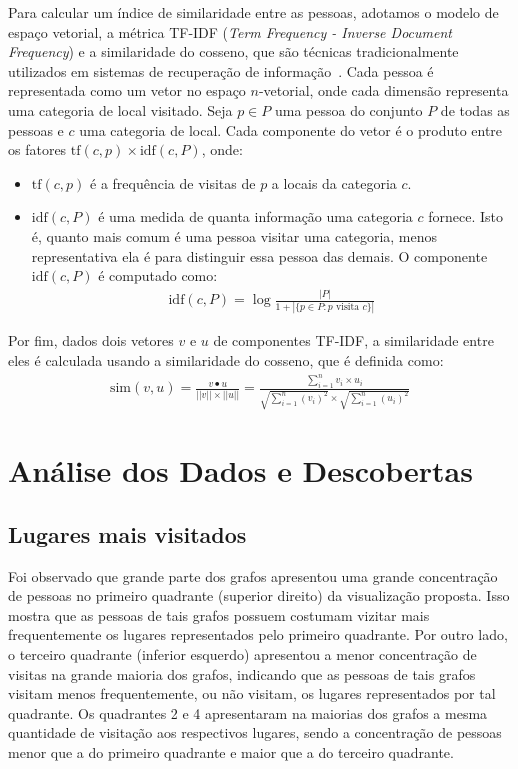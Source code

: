 \documentclass[12pt]{article}
\begin{document}
Para calcular um índice de similaridade entre as pessoas, adotamos o modelo de espaço vetorial, a métrica TF-IDF ({\em Term Frequency - Inverse Document Frequency}) e a similaridade do cosseno, que são técnicas tradicionalmente utilizados em sistemas de recuperação de informação~\cite{manning2008}. Cada pessoa é representada como um vetor no espaço $n$-vetorial, onde cada dimensão representa uma categoria de local visitado. Seja $p \in P$ uma pessoa do conjunto $P$ de todas as pessoas e $c$ uma categoria de local. Cada componente do vetor é o produto entre os fatores $\text{tf}(c, p) \times \text{idf}(c, P)$, onde:
\begin{itemize}
\item $\text{tf}(c, p)$ é a frequência de visitas de $p$ a locais da categoria $c$.
\item $\text{idf}(c, P)$ é uma medida de quanta informação uma categoria $c$ fornece. Isto é, quanto mais comum é uma pessoa visitar uma categoria, menos representativa ela é para distinguir essa pessoa das demais. O componente $\text{idf}(c, P)$ é computado como:
\begin{align*}
\text{idf}(c, P) = \log \frac{|P|}{1 + |\{p \in P : \text{$p$ visita $c$}  \}|}
\end{align*}
\end{itemize}

Por fim, dados dois vetores $v$ e $u$ de componentes TF-IDF, a similaridade entre eles é calculada usando a similaridade do cosseno, que é definida como:
\begin{align*}
\text{sim}(v, u) = \frac{v \bullet u}{||v|| \times ||u||} = \frac{\sum_{i=1}^{n} v_i \times u_i}{\sqrt{\sum_{i=1}^{n} (v_i)^2} \times \sqrt{\sum_{i=1}^{n} (u_i)^2}}
\end{align*}




\section{Análise dos Dados e Descobertas}

\subsection{Lugares mais visitados}

Foi observado que grande parte dos grafos apresentou uma grande concentração de pessoas no primeiro quadrante (superior direito) da visualização proposta. Isso mostra que as pessoas de tais grafos possuem costumam vizitar mais frequentemente os lugares representados pelo primeiro quadrante. Por outro lado, o terceiro quadrante (inferior esquerdo) apresentou a menor concentração de visitas na grande maioria dos grafos, indicando que as pessoas de tais grafos visitam menos frequentemente, ou não visitam, os lugares representados por tal quadrante. Os quadrantes 2 e 4 apresentaram na maiorias dos grafos a mesma quantidade de visitação aos respectivos lugares, sendo a concentração de pessoas menor que a do primeiro quadrante e maior que a do terceiro quadrante.
\end{document}
